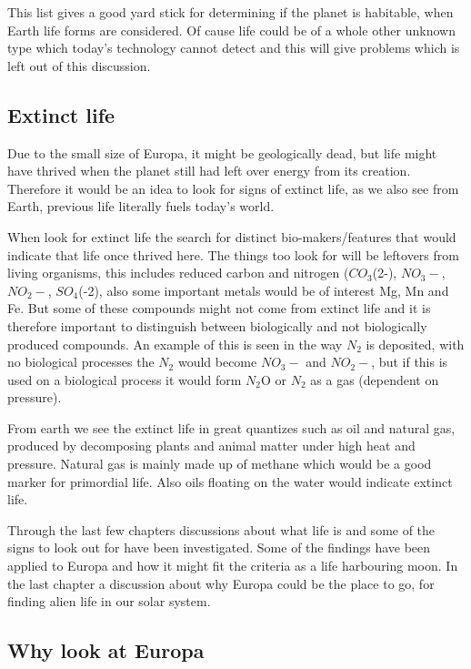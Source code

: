 This list gives a good yard stick for determining if the planet is habitable, when Earth life forms are considered. Of cause life could be of a whole other unknown type which today's technology cannot detect and this will give problems which is left out of this discussion.

\subsection{Extinct life}

Due to the small size of Europa, it might be geologically dead, but life might have thrived when the planet still had left over energy from its creation. Therefore it would be an idea to look for signs of extinct life, as we also see from Earth, previous life literally fuels today's world.

When look for extinct life the search for distinct bio-makers/features that would indicate that life once thrived here. The things too look for will be leftovers from living organisms, this includes reduced carbon and nitrogen ($CO_3$(2-), $NO_3-$, $NO_2-$, $SO_4$(-2), also some important metals would be of interest Mg, Mn and Fe. But some of these compounds might not come from extinct life and it is therefore important to distinguish between biologically and not biologically produced compounds. An example of this is seen in the way $N_2$ is deposited, with no biological processes the $N_2$ would become $NO_3-$ and $NO_2-$, but if this is used on a biological process it would form $N_2$O or $N_2$ as a gas  (dependent on pressure)\cite{BiomarkersMars}.

From earth we see the extinct life in great quantizes such as oil and natural gas, produced by decomposing plants and animal matter under high heat and pressure. Natural gas is mainly made up of methane which would be a good marker for primordial life. Also oils floating on the water would indicate extinct life.

Through the last few chapters discussions about what life is and some of the signs to look out for have been investigated. Some of the findings have been applied to Europa and how it might fit the criteria as a life harbouring moon. In the last chapter a discussion about why Europa could be the place to go, for finding alien life in our solar system.

\subsection{Why look at Europa}

